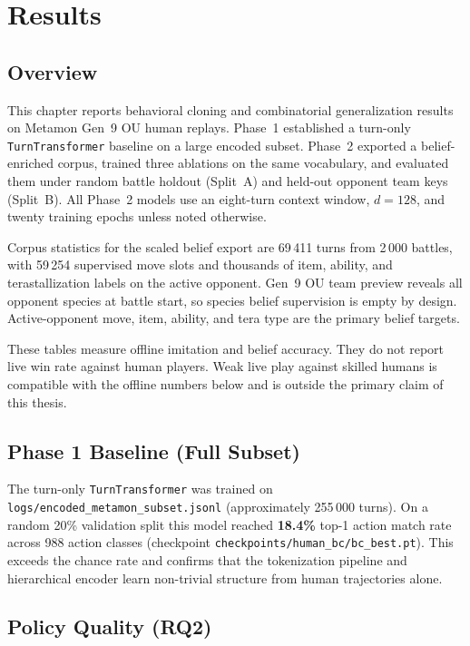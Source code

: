 \chapter{Results}
\label{ch:results}

\section{Overview}

This chapter reports behavioral cloning and combinatorial generalization results
on Metamon Gen~9 OU human replays. Phase~1 established a turn-only
\texttt{TurnTransformer} baseline on a large encoded subset. Phase~2 exported a
belief-enriched corpus, trained three ablations on the same vocabulary, and
evaluated them under random battle holdout (Split~A) and held-out opponent team
keys (Split~B). All Phase~2 models use an eight-turn context window,
$d=128$, and twenty training epochs unless noted otherwise.

Corpus statistics for the scaled belief export are
69\,411 turns from 2\,000 battles, with 59\,254 supervised move slots and
thousands of item, ability, and terastallization labels on the active opponent.
Gen~9 OU team preview reveals all opponent species at battle start, so species
belief supervision is empty by design. Active-opponent move, item, ability, and
tera type are the primary belief targets.

These tables measure offline imitation and belief accuracy. They do not report
live win rate against human players. Weak live play against skilled humans is
compatible with the offline numbers below and is outside the primary claim of
this thesis.

\section{Phase 1 Baseline (Full Subset)}

The turn-only \texttt{TurnTransformer} was trained on
\texttt{logs/encoded\_metamon\_subset.jsonl} (approximately 255\,000 turns).
On a random 20\% validation split this model reached
\textbf{18.4\%} top-1 action match rate across 988 action classes
(checkpoint \texttt{checkpoints/human\_bc/bc\_best.pt}).
This exceeds the chance rate and confirms that the tokenization pipeline and
hierarchical encoder learn non-trivial structure from human trajectories alone.

\section{Policy Quality (RQ2)}

